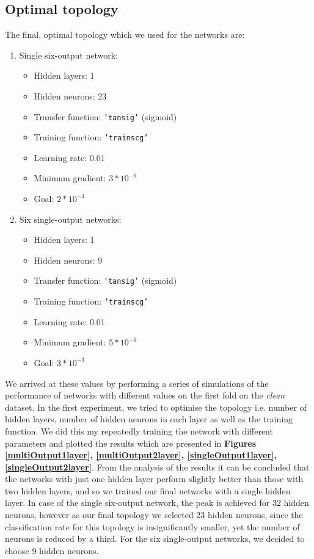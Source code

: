 \documentclass[a4paper]{article}
\begin{document}
\subsection{Optimal topology}
The final, optimal topology which we used for the networks are:
\begin{enumerate}
\item Single six-output network:
\begin{itemize}
\item Hidden layers: 1
\item Hidden neurons: 23
\item Transfer function: \texttt{'tansig'} (sigmoid)
\item Training function: \texttt{'trainscg'}
\item Learning rate: 0.01
\item Minimum gradient: $3*10^{-6}$
\item Goal: $2*10^{-3}$
\end{itemize}
\item Six single-output networks:
\begin{itemize}
\item Hidden layers: 1
\item Hidden neurons: 9
\item Transfer function: \texttt{'tansig'} (sigmoid)
\item Training function: \texttt{'trainscg'}
\item Learning rate: 0.01
\item Minimum gradient: $5*10^{-6}$
\item Goal: $3*10^{-3}$
\end{itemize}
\end{enumerate}
We arrived at these values by performing a series of simulations of the performance of networks with different values on the first fold on the \emph{clean} dataset. In the first experiment, we tried to optimise the topology i.e. number of hidden layers, number of hidden neurons in each layer as well as the training function. We did this my repeatedly training the network with different parameters and plotted the results which are presented in \textbf{Figures \ref{multiOutput1layer}, \ref{multiOutput2layer}, \ref{singleOutput1layer}, \ref{singleOutput2layer}}. From the analysis of the results it can be concluded that the networks with just one hidden layer perform slightly better than those with two hidden layers, and so we trained our final networks with a single hidden layer. In case of the single six-output network, the peak is achieved for 32 hidden neurons, however as our final topology we selected 23 hidden neurons, since the classification rate for this topology is insignificantly smaller, yet the number of neurons is reduced by a third. For the six single-output networks, we decided to choose 9 hidden neurons. \medskip
\end{document}
